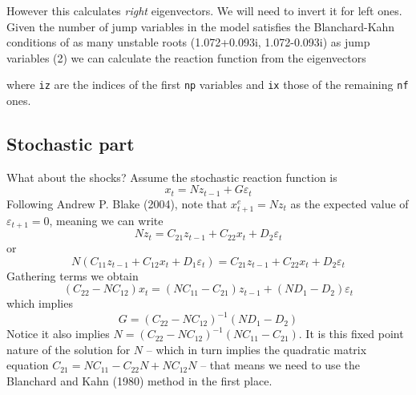 \documentclass[
  letterpaper,
]{book}
\newenvironment{Shaded}{\begin{snugshade}}{\end{snugshade}}
\newcommand{\CommentTok}[1]{\textcolor[rgb]{0.37,0.37,0.37}{#1}}
\newcommand{\DecValTok}[1]{\textcolor[rgb]{0.68,0.00,0.00}{#1}}
\newcommand{\FunctionTok}[1]{\textcolor[rgb]{0.28,0.35,0.67}{#1}}
\newcommand{\NormalTok}[1]{\textcolor[rgb]{0.00,0.23,0.31}{#1}}
\newcommand{\OtherTok}[1]{\textcolor[rgb]{0.00,0.23,0.31}{#1}}
\newcommand{\SpecialCharTok}[1]{\textcolor[rgb]{0.37,0.37,0.37}{#1}}
\begin{document}
However this calculates \emph{right} eigenvectors. We will need to
invert it for left ones. Given the number of jump variables in the model
satisfies the Blanchard-Kahn conditions of as many unstable roots
(1.072+0.093i, 1.072-0.093i) as jump variables (2) we can calculate the
reaction function from the eigenvectors

\begin{Shaded}
\end{Shaded}

where \texttt{iz} are the indices of the first \texttt{np} variables and
\texttt{ix} those of the remaining \texttt{nf} ones.

\hypertarget{stochastic-part}{%
\subsection{Stochastic part}\label{stochastic-part}}

What about the shocks? Assume the stochastic reaction function is \[
  x_t = N z_{t-1} + G \varepsilon_t 
\] Following Andrew P. Blake (2004), note that \(x_{t+1}^e = N z_t\) as
the expected value of \(\varepsilon_{t+1}=0\), meaning we can write \[
 Nz_t = C_{21}z_{t-1} + C_{22} x_t + D_2 \varepsilon_t
\] or \[
 N\left( C_{11}z_{t-1} + C_{12}x_t + D_1 \varepsilon_t\right) = C_{21}z_{t-1} + C_{22} x_t + D_2 \varepsilon_t
\] Gathering terms we obtain \[
  (C_{22} - N C_{12}) x_t = (NC_{11} - C_{21}) z_{t-1} + (N D_1 - D_2) \varepsilon_t
\] which implies \[
G=(C_{22} - N C_{12})^{-1}(N D_1 - D_2) 
\] Notice it also implies
\(N = (C_{22} - N C_{12})^{-1}(NC_{11} - C_{21})\). It is this fixed
point nature of the solution for \(N\) -- which in turn implies the
quadratic matrix equation \(C_{21} = NC_{11} - C_{22}N + N C_{12}N\) --
that means we need to use the Blanchard and Kahn (1980) method in the
first place.
\end{document}
